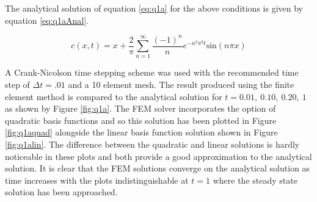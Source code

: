 \documentclass[11pt]{article}
\begin{document}
The analytical solution of equation \eqref{eq:q1a} for the above conditions is given by equation \eqref{eq:q1aAnal}.

\begin{equation} \label{eq:q1aAnal}
c(x,t) = x + \frac{2}{\pi} \sum_{n=1}^{\infty} \frac{(-1)^n}{n} e^{-n^2\pi^2t}\text{sin}(n\pi x)
\end{equation}



A Crank-Nicolson time stepping scheme was used with the recommended time step of $\Delta t = .01$ and a 10 element mesh. The result produced using the finite element method is compared to the analytical solution for $ t = 0.01, \ 0.10, \ 0.20, \ 1$ as shown by Figure \ref{fig:q1a}. The FEM solver incorporates the option of quadratic basis functions and so this solution has been plotted in Figure \ref{fig:q1aquad} alongside the linear basis function solution shown in Figure \ref{fig:q1alin}. The difference between the quadratic and linear solutions is hardly noticeable in these plots and both provide a good approximation to the analytical solution. It is clear that the FEM solutions converge on the analytical solution as time increases with the plots indistinguishable at $t = 1$ where the steady state solution has been approached.
\end{document}
